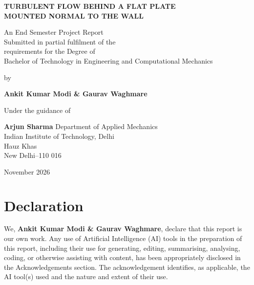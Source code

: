 \documentclass[12pt,a4paper,oneside]{report}
\begin{document}
\begin{titlepage}
\centering
\vspace*{15mm}
{\Large\bfseries TURBULENT FLOW BEHIND A FLAT PLATE\\[4pt] MOUNTED NORMAL TO THE WALL\par}
\vspace{20mm}
An End Semester Project Report\\
Submitted in partial fulfilment of the\\
requirements for the Degree of\\
Bachelor of Technology in Engineering and Computational Mechanics
\vspace{20mm}

by
\vspace{8mm}

{\bfseries Ankit Kumar Modi \& Gaurav Waghmare}
\vspace{18mm}

Under the guidance of
\vspace{5mm}

{\bfseries Arjun Sharma}
\vfill
Department of Applied Mechanics\\
Indian Institute of Technology, Delhi\\
Hauz Khas\\
New Delhi--110 016
\vspace{8mm}

November 2026
\vspace*{15mm}
\end{titlepage}

\setcounter{page}{1}

\chapter*{Declaration}
\thispagestyle{plain}
We, \textbf{Ankit Kumar Modi \& Gaurav Waghmare}, declare that this report is our own work. Any use of Artificial Intelligence (AI) tools in the preparation of this report, including their use for generating, editing, summarising, analysing, coding, or otherwise assisting with content, has been appropriately disclosed in the Acknowledgements section. The acknowledgement identifies, as applicable, the AI tool(s) used and the nature and extent of their use.
\end{document}

